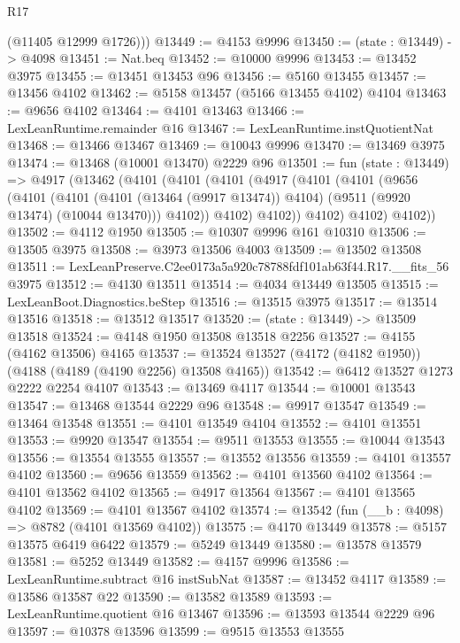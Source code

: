 \begin{lexlean}{R17}
\begin{coremodule}
        (@11405 @12999 @1726)))
@13449 := @4153 @9996
@13450 := (state : @13449) -> @4098
@13451 := Nat.beq
@13452 := @10000 @9996
@13453 := @13452 @3975
@13455 := @13451 @13453 @96
@13456 := @5160 @13455
@13457 := @13456 @4102
@13462 := @5158 @13457 (@5166 @13455 @4102) @4104
@13463 := @9656 @4102
@13464 := @4101 @13463
@13466 := LexLeanRuntime.remainder @16
@13467 := LexLeanRuntime.instQuotientNat
@13468 := @13466 @13467
@13469 := @10043 @9996
@13470 := @13469 @3975
@13474 := @13468 (@10001 @13470) @2229 @96
@13501 := fun (state : @13449) =>
  @4917
    (@13462
      (@4101
        (@4101
          (@4101
            (@4917
              (@4101
                (@4101
                  (@9656
                    (@4101
                      (@4101
                        (@4101 (@13464 (@9917 @13474)) @4104)
                        (@9511 (@9920 @13474) (@10044 @13470)))
                      @4102))
                  @4102)
                @4102))
            @4102)
          @4102)
        @4102))
@13502 := @4112 @1950
@13505 := @10307 @9996 @161 @10310
@13506 := @13505 @3975
@13508 := @3973 @13506 @4003
@13509 := @13502 @13508
@13511 := LexLeanPreserve.C2ee0173a5a920c78788fdf101ab63f44.R17.__fits_56 @3975
@13512 := @4130 @13511
@13514 := @4034 @13449 @13505
@13515 := LexLeanBoot.Diagnostics.beStep
@13516 := @13515 @3975
@13517 := @13514 @13516
@13518 := @13512 @13517
@13520 := (state : @13449) -> @13509 @13518
@13524 := @4148 @1950 @13508 @13518 @2256
@13527 := @4155 (@4162 @13506) @4165
@13537 := @13524 @13527 (@4172 (@4182 @1950)) (@4188 (@4189 (@4190 @2256) @13508 @4165))
@13542 := @6412 @13527 @1273 @2222 @2254 @4107
@13543 := @13469 @4117
@13544 := @10001 @13543
@13547 := @13468 @13544 @2229 @96
@13548 := @9917 @13547
@13549 := @13464 @13548
@13551 := @4101 @13549 @4104
@13552 := @4101 @13551
@13553 := @9920 @13547
@13554 := @9511 @13553
@13555 := @10044 @13543
@13556 := @13554 @13555
@13557 := @13552 @13556
@13559 := @4101 @13557 @4102
@13560 := @9656 @13559
@13562 := @4101 @13560 @4102
@13564 := @4101 @13562 @4102
@13565 := @4917 @13564
@13567 := @4101 @13565 @4102
@13569 := @4101 @13567 @4102
@13574 := @13542 (fun (__b : @4098) => @8782 (@4101 @13569 @4102))
@13575 := @4170 @13449
@13578 := @5157 @13575 @6419 @6422
@13579 := @5249 @13449
@13580 := @13578 @13579
@13581 := @5252 @13449
@13582 := @4157 @9996
@13586 := LexLeanRuntime.subtract @16 instSubNat
@13587 := @13452 @4117
@13589 := @13586 @13587 @22
@13590 := @13582 @13589
@13593 := LexLeanRuntime.quotient @16 @13467
@13596 := @13593 @13544 @2229 @96
@13597 := @10378 @13596
@13599 := @9515 @13553 @13555

\end{coremodule}
\end{lexlean}
